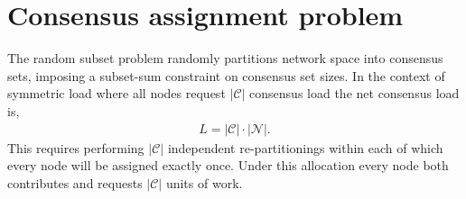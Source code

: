 \documentclass[twocolumn, aps, amsmath, amssymb, nofootinbib, superscriptaddress, longbibliography, floatfix, eqsecnum, rmp]{revtex4-2}
\begin{document}


%
%

\section{Consensus assignment problem} \label{sec:consensus_assignment_problem}

The random subset problem randomly partitions network space into consensus sets, imposing a subset-sum constraint on consensus set sizes. In the context of symmetric load where all nodes request $|\mathcal{C}|$ consensus load the net consensus load is,
\begin{align}
	L = |\mathcal{C}| \cdot |\mathcal{N}|.
\end{align}
This requires performing $|\mathcal{C}|$ independent re-partitionings within each of which every node will be assigned exactly once. Under this allocation every node both contributes and requests $|\mathcal{C}|$ units of work.
\end{document}
